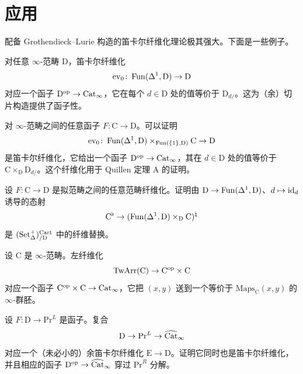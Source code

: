 \section{应用}

\nitem\label{L20-5.1} 配备 Grothendieck–Lurie 构造的笛卡尔纤维化理论极其强大。下面是一些例子。

\begin{example}\label{L20-5.2}
对任意 $\infty$-范畴 $\mathrm{D}$，笛卡尔纤维化
\[
\mathrm{ev}_0\colon\operatorname{Fun}(\Delta^1,\mathrm{D})\to\mathrm{D}
\]
对应一个函子 $\mathrm{D}^{\mathrm{op}}\to\operatorname{Cat}_\infty$，它在每个 $d\in\mathrm{D}$ 处的值等价于 $\mathrm{D}_{d/}$。这为（余）切片构造提供了函子性。
\end{example}

\begin{example}\label{L20-5.3}
对 $\infty$-范畴之间的任意函子 $F\colon\mathrm{C}\to\mathrm{D}$。可以证明
\[
\mathrm{ev}_0\colon\operatorname{Fun}(\Delta^1,\mathrm{D})\times_{\operatorname{Fun}(\{1\},\mathrm{D})}\mathrm{C}\to\mathrm{D}
\]
是笛卡尔纤维化，它给出一个函子 $\mathrm{D}^{\mathrm{op}}\to\operatorname{Cat}_\infty$，其在 $d\in\mathrm{D}$ 处的值等价于 $\mathrm{C}\times_{\mathrm{D}}\mathrm{D}_{d/}$。这个纤维化用于 Quillen 定理 A 的证明。
\end{example}

\begin{exercise}\label{L20-5.4}
设 $F\colon\mathrm{C}\to\mathrm{D}$ 是拟范畴之间的任意范畴纤维化。证明由 $\mathrm{D}\to\operatorname{Fun}(\Delta^1,\mathrm{D})$、$d\mapsto\operatorname{id}_d$ 诱导的态射
\[
\mathrm{C}^{\flat}\to(\operatorname{Fun}(\Delta^1,\mathrm{D})\times_{\mathrm{D}}\mathrm{C})^{\natural}
\]
是 $(\operatorname{Set}^+_\Delta)^{\mathrm{Cart}}_{/\mathrm{D}}$ 中的纤维替换。
\end{exercise}

\begin{example}\label{L20-5.5}
设 $\mathrm{C}$ 是 $\infty$-范畴。左纤维化
\[
\mathrm{TwArr}(\mathrm{C})\to\mathrm{C}^{\mathrm{op}}\times\mathrm{C}
\]
对应一个函子 $\mathrm{C}^{\mathrm{op}}\times\mathrm{C}\to\operatorname{Cat}_\infty$，它把 $(x,y)$ 送到一个等价于 $\mathrm{Maps}_{\mathrm{C}}(x,y)$ 的 $\infty$-群胚。
\end{example}

\begin{exercise}\label{L20-5.6}
设 $F\colon\mathrm{D}\to\mathrm{Pr}^{L}$ 是函子。复合
\[
\mathrm{D}\to\mathrm{Pr}^{L}\to\widehat{\operatorname{Cat}}_\infty
\]
对应一个（未必小的）余笛卡尔纤维化 $\mathrm{E}\to\mathrm{D}$。证明它同时也是笛卡尔纤维化，并且相应的函子 $\mathrm{D}^{\mathrm{op}}\to\widehat{\operatorname{Cat}}_\infty$ 穿过 $\mathrm{Pr}^{R}$ 分解。
\end{exercise}


